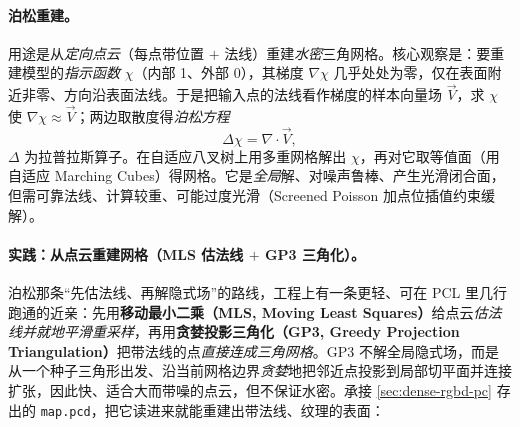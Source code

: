\paragraph{泊松重建。}
用途是从\emph{定向点云}（每点带位置 $+$ 法线）重建\emph{水密}三角网格\cite{kazhdan2006poisson}。核心观察是：要重建模型的\emph{指示函数} $\chi$（内部 1、外部 0），其梯度 $\nabla\chi$ 几乎处处为零，仅在表面附近非零、方向沿表面法线。于是把输入点的法线看作梯度的样本向量场 $\vec{V}$，求 $\chi$ 使 $\nabla\chi\approx\vec{V}$；两边取散度得\emph{泊松方程}
\begin{equation}
  \Delta\chi=\nabla\cdot\vec{V},
  \label{eq:dense-poisson}
\end{equation}
$\Delta$ 为拉普拉斯算子。在自适应八叉树上用多重网格解出 $\chi$，再对它取等值面（用自适应 Marching Cubes）得网格。它是\emph{全局}解、对噪声鲁棒、产生光滑闭合面，但需可靠法线、计算较重、可能过度光滑（Screened Poisson 加点位插值约束缓解）。

\paragraph{实践：从点云重建网格（MLS 估法线 $+$ GP3 三角化）。}
泊松那条“先估法线、再解隐式场”的路线，工程上有一条更轻、可在 PCL 里几行跑通的近亲：先用\textbf{移动最小二乘（MLS, Moving Least Squares）}\cite{alexa2003pointset}给点云\emph{估法线并就地平滑重采样}，再用\textbf{贪婪投影三角化（GP3, Greedy Projection Triangulation）}\cite{marton2009fast}把带法线的点\emph{直接连成三角网格}。GP3 不解全局隐式场，而是从一个种子三角形出发、沿当前网格边界\emph{贪婪}地把邻近点投影到局部切平面并连接扩张，因此快、适合大而带噪的点云，但不保证水密。承接 \cref{sec:dense-rgbd-pc} 存出的 \texttt{map.pcd}，把它读进来就能重建出带法线、纹理的表面：

